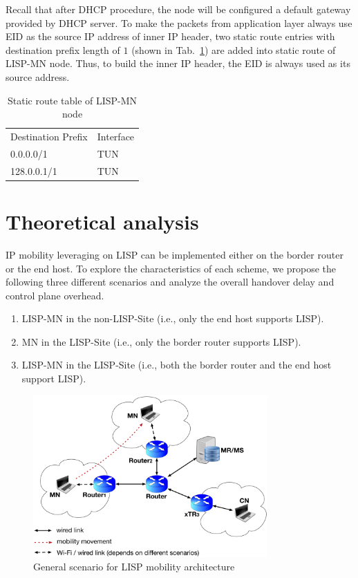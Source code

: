 Recall that after DHCP procedure, the node will be configured a default gateway provided by DHCP server. To make the packets from application layer always use EID as the source IP address of inner IP header, two static route entries with destination prefix length of $1$ (shown in Tab.~\ref{tab:static-route-table}) are added into static route of LISP-MN node. Thus, to build the inner IP header, the EID is always used as its source address.
\begin{table}[]
	\centering
	\caption{Static route table of LISP-MN node}
	\label{tab:static-route-table}
	\begin{tabular}{ll}
		Destination Prefix & Interface \\
		0.0.0.0/1          & TUN       \\
		128.0.0.1/1        & TUN      
	\end{tabular}
\end{table}



\section{Theoretical analysis}
\label{sec:ns3_analysis}
IP mobility leveraging on LISP can be implemented either on the border router or the end host. To explore the characteristics of each scheme, we propose the following three different scenarios and analyze the overall handover delay and control plane overhead. 
\begin{enumerate}[noitemsep,topsep=0pt]
	\item LISP-MN in the non-LISP-Site (i.e., only the end host supports LISP). 
	\item MN in the LISP-Site (i.e., only the border router supports LISP). 
	\item LISP-MN in the LISP-Site (i.e., both the border router and the end host support LISP). 
\end{enumerate}	
\begin{figure}[!th]
	\centering
	\includegraphics[width=0.8\textwidth]{Pics/LISP_mobility_archi}
	\caption{General scenario for LISP mobility architecture}
	\label{sim_archi}
\end{figure}

